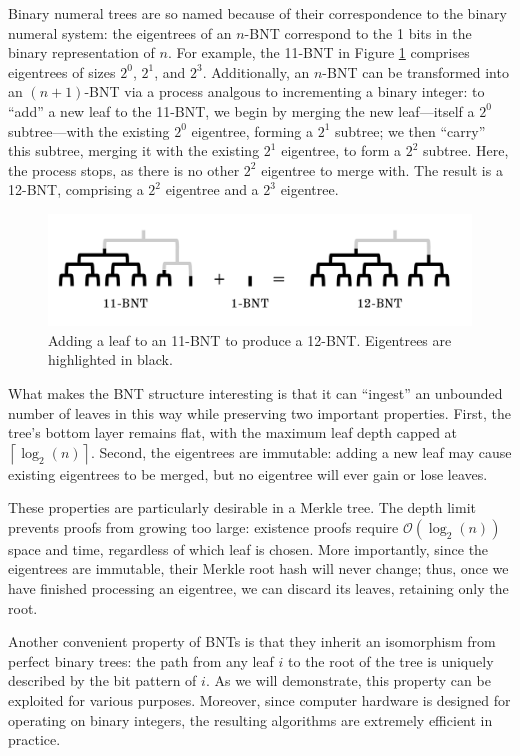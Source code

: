 \documentclass[twocolumn]{article}
\begin{document}
Binary numeral trees are so named because of their correspondence to the binary numeral system: the eigentrees of an $n$-BNT correspond to the 1 bits in the binary representation of $n$. For example, the 11-BNT in Figure \ref{img-bnt} comprises eigentrees of sizes $2^0$, $2^1$, and $2^3$. Additionally, an $n$-BNT can be transformed into an $(n+1)$-BNT via a process analgous to incrementing a binary integer: to ``add'' a new leaf to the 11-BNT, we begin by merging the new leaf---itself a $2^0$ subtree---with the existing $2^0$ eigentree, forming a $2^1$ subtree; we then ``carry'' this subtree, merging it with the existing $2^1$ eigentree, to form a $2^2$ subtree. Here, the process stops, as there is no other $2^2$ eigentree to merge with. The result is a 12-BNT, comprising a $2^2$ eigentree and a $2^3$ eigentree.

\begin{figure}[t]
\includegraphics[scale=0.4]{bnt}
\centering
\caption{Adding a leaf to an 11-BNT to produce a 12-BNT. Eigentrees are highlighted in black.}
\label{img-bnt}
\end{figure}

What makes the BNT structure interesting is that it can ``ingest'' an unbounded number of leaves in this way while preserving two important properties. First, the tree's bottom layer remains flat, with the maximum leaf depth capped at $\left \lceil{\log_2(n)}\right \rceil$. Second, the eigentrees are immutable: adding a new leaf may cause existing eigentrees to be merged, but no eigentree will ever gain or lose leaves.

These properties are particularly desirable in a Merkle tree. The depth limit prevents proofs from growing too large: existence proofs require $\mathcal{O}(\log_2(n))$ space and time, regardless of which leaf is chosen. More importantly, since the eigentrees are immutable, their Merkle root hash will never change; thus, once we have finished processing an eigentree, we can discard its leaves, retaining only the root.

Another convenient property of BNTs is that they inherit an isomorphism from perfect binary trees: the path from any leaf $i$ to the root of the tree is uniquely described by the bit pattern of $i$. As we will demonstrate, this property can be exploited for various purposes. Moreover, since computer hardware is designed for operating on binary integers, the resulting algorithms are extremely efficient in practice.
\end{document}
